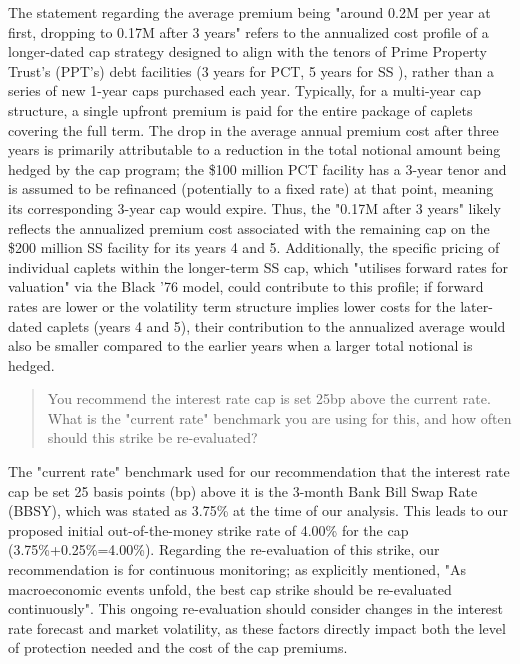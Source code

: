\documentclass[11pt, a4paper, british]{article}
\begin{document}
The statement regarding the average premium being "around 0.2M per year at first, dropping to 0.17M after 3 years"  refers to the annualized cost profile of a longer-dated cap strategy designed to align with the tenors of Prime Property Trust's (PPT's) debt facilities (3 years for PCT, 5 years for SS ), rather than a series of new 1-year caps purchased each year. Typically, for a multi-year cap structure, a single upfront premium is paid for the entire package of caplets covering the full term. The drop in the average annual premium cost after three years is primarily attributable to a reduction in the total notional amount being hedged by the cap program; the \$100 million PCT facility has a 3-year tenor and is assumed to be refinanced (potentially to a fixed rate) at that point, meaning its corresponding 3-year cap would expire. Thus, the "0.17M after 3 years" likely reflects the annualized premium cost associated with the remaining cap on the \$200 million SS facility for its years 4 and 5. Additionally, the specific pricing of individual caplets within the longer-term SS cap, which "utilises forward rates for valuation" via the Black '76 model, could contribute to this profile; if forward rates are lower or the volatility term structure implies lower costs for the later-dated caplets (years 4 and 5), their contribution to the annualized average would also be smaller compared to the earlier years when a larger total notional is hedged.

\newpage

\begin{quote}
    You recommend the interest rate cap is set 25bp above the current rate. What is the "current rate" benchmark you are using for this, and how often should this strike be re-evaluated?
\end{quote}

The "current rate" benchmark used for our recommendation that the interest rate cap be set 25 basis points (bp) above it is the 3-month Bank Bill Swap Rate (BBSY), which was stated as 3.75\% at the time of our analysis. This leads to our proposed initial out-of-the-money strike rate of 4.00\% for the cap (3.75\%+0.25\%=4.00\%). Regarding the re-evaluation of this strike, our recommendation is for continuous monitoring; as explicitly mentioned, "As macroeconomic events unfold, the best cap strike should be re-evaluated continuously". This ongoing re-evaluation should consider changes in the interest rate forecast and market volatility, as these factors directly impact both the level of protection needed and the cost of the cap premiums.
\end{document}
